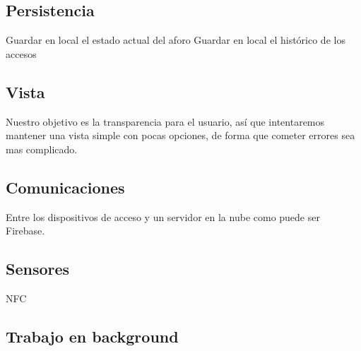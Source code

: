 \documentclass[a4paper,openright,12pt]{article}
\begin{document}
\subsection{Persistencia}
Guardar en local el estado actual del aforo
Guardar en local el histórico de los accesos
\subsection{Vista}
Nuestro objetivo es la transparencia para el usuario, así que intentaremos mantener una vista simple con pocas opciones, de forma que cometer errores sea mas complicado.
\subsection{Comunicaciones}
Entre los dispositivos de acceso y un servidor en la nube como puede ser Firebase.
\subsection{Sensores}
NFC
\subsection{Trabajo en background}





\end{document}
